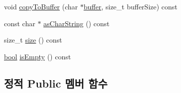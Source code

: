 \begin{DoxyCompactItemize}
\item 
void \hyperlink{class_simple_string_af834204c528ec23e5b39fbeb9a991144}{copy\+To\+Buffer} (char $\ast$\hyperlink{_hello_test_8cpp_a8be6d469a7cd1c8d66cc6d2d1e10c65b}{buffer}, size\+\_\+t buffer\+Size) const 
\item 
const char $\ast$ \hyperlink{class_simple_string_af7c0efaf31f42553f05719903c830be1}{as\+Char\+String} () const 
\item 
size\+\_\+t \hyperlink{class_simple_string_aac782da1f912bceb5d8ad00c8dc892ac}{size} () const 
\item 
\hyperlink{avb__gptp_8h_af6a258d8f3ee5206d682d799316314b1}{bool} \hyperlink{class_simple_string_a479432127ee77145cc19d6a2d1590821}{is\+Empty} () const 
\end{DoxyCompactItemize}
\subsection*{정적 Public 멤버 함수}
